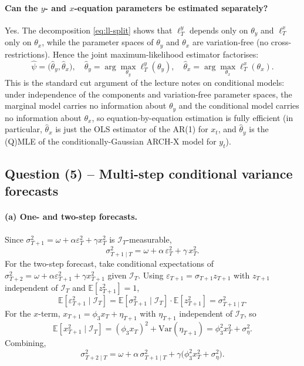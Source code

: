 \documentclass[12pt]{article}
\newcommand{\E}{\mathbb{E}}
\newcommand{\Var}{\mathrm{Var}}
\newcommand{\Info}{\mathcal{I}}
\begin{document}
\paragraph{Can the $y$- and $x$-equation parameters be estimated separately?} Yes. The decomposition \eqref{eq:ll-split} shows that $\ell_T^{y}$ depends only on $\theta_y$ and $\ell_T^{x}$ only on $\theta_x$, while the parameter spaces of $\theta_y$ and $\theta_x$ are variation-free (no cross-restrictions). Hence the joint maximum-likelihood estimator factorises:
\begin{equation*}
\widehat{\psi} = \big(\widehat{\theta}_y,\widehat{\theta}_x\big),\quad
\widehat{\theta}_y=\arg\max_{\theta_y}\ell_T^{y}(\theta_y),\quad
\widehat{\theta}_x=\arg\max_{\theta_x}\ell_T^{x}(\theta_x).
\end{equation*}
This is the standard cut argument of the lecture notes on conditional models: under independence of the components and variation-free parameter spaces, the marginal model carries no information about $\theta_y$ and the conditional model carries no information about $\theta_x$, so equation-by-equation estimation is fully efficient (in particular, $\widehat{\theta}_x$ is just the OLS estimator of the AR(1) for $x_t$, and $\widehat{\theta}_y$ is the (Q)MLE of the conditionally-Gaussian ARCH-X model for $y_t$).

\subsection*{Question (5) -- Multi-step conditional variance forecasts}\label{sec:p3-q5}

\paragraph{(a) One- and two-step forecasts.} Since $\sigma_{T+1}^2=\omega+\alpha\varepsilon_T^2+\gamma x_T^2$ is $\Info_T$-measurable,
\begin{equation}
\sigma_{T+1\mid T}^2 = \omega+\alpha\,\varepsilon_T^2+\gamma\,x_T^2.\label{eq:f1}
\end{equation}
For the two-step forecast, take conditional expectations of $\sigma_{T+2}^2=\omega+\alpha\varepsilon_{T+1}^2+\gamma x_{T+1}^2$ given $\Info_T$. Using $\varepsilon_{T+1}=\sigma_{T+1}z_{T+1}$ with $z_{T+1}$ independent of $\Info_T$ and $\E[z_{T+1}^2]=1$,
\begin{equation*}
\E[\varepsilon_{T+1}^2\mid\Info_T]
= \E[\sigma_{T+1}^2\mid\Info_T]\cdot\E[z_{T+1}^2]
= \sigma_{T+1\mid T}^2.
\end{equation*}
For the $x$-term, $x_{T+1}=\phi_3 x_T+\eta_{T+1}$ with $\eta_{T+1}$ independent of $\Info_T$, so
\begin{equation*}
\E[x_{T+1}^2\mid\Info_T] = (\phi_3 x_T)^2 + \Var(\eta_{T+1}) = \phi_3^2 x_T^2 + \sigma_\eta^2.
\end{equation*}
Combining,
\begin{equation}
\sigma_{T+2\mid T}^2
= \omega + \alpha\,\sigma_{T+1\mid T}^2 + \gamma\big(\phi_3^2 x_T^2 + \sigma_\eta^2\big).\label{eq:f2}
\end{equation}
\end{document}
